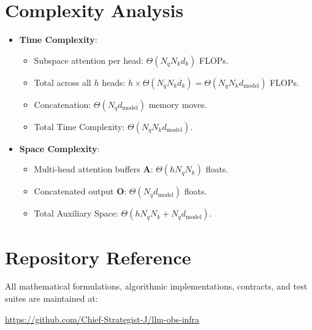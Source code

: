 \documentclass[11pt,a4paper]{article}
\theoremstyle{definition}
\begin{document}
\section{Complexity Analysis}
\begin{itemize}
    \item \textbf{Time Complexity}:
    \begin{itemize}
        \item Subspace attention per head: $\Theta(N_q N_k d_k)$ FLOPs.
        \item Total across all $h$ heads: $h \times \Theta(N_q N_k d_k) = \Theta(N_q N_k d_{\text{model}})$ FLOPs.
        \item Concatenation: $\Theta(N_q d_{\text{model}})$ memory moves.
        \item Total Time Complexity: $\Theta(N_q N_k d_{\text{model}})$.
    \end{itemize}
    \item \textbf{Space Complexity}:
    \begin{itemize}
        \item Multi-head attention buffers $\mathbf{A}$: $\Theta(h N_q N_k)$ floats.
        \item Concatenated output $\mathbf{O}$: $\Theta(N_q d_{\text{model}})$ floats.
        \item Total Auxiliary Space: $\Theta(h N_q N_k + N_q d_{\text{model}})$.
    \end{itemize}
\end{itemize}

\section{Repository Reference}
All mathematical formulations, algorithmic implementations, contracts, and test suites are maintained at:
\begin{center}
\url{https://github.com/Chief-Strategist-J/llm-obs-infra}
\end{center}
\end{document}
